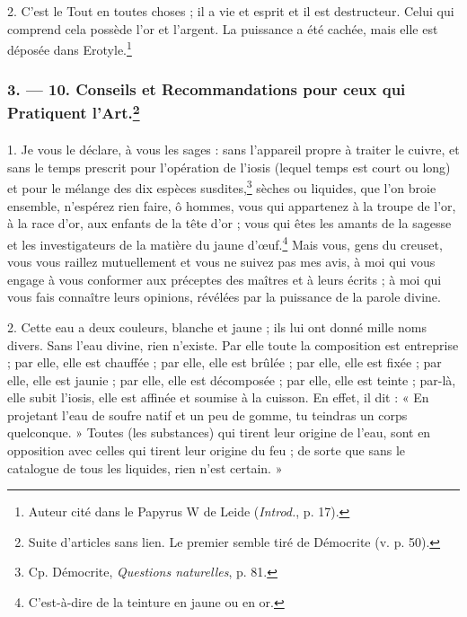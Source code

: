 \documentclass[a4paper, 11pt, oneside, polutonikogreek, french]{article}
\begin{document}
2. C'est le Tout en toutes choses ; il a vie et esprit et il est destructeur. Celui qui comprend cela possède l'or et l'argent. La puissance a été cachée, mais elle est déposée dans Erotyle.\footnote{Auteur cité dans le Papyrus W de Leide (\emph{Introd.}, p. 17).}

\bigskip
\centerline{\EightStarTaper}
\centerline{\EightStarTaper\EightStarTaper}
\bigskip

\subsubsection[3. --- 10. Conseils et Recommandations pour ceux qui Pratiquent l'Art.]{3. --- 10. Conseils et Recommandations pour ceux qui Pratiquent l'Art.\footnote{Suite d'articles sans lien. Le premier semble tiré de Démocrite (v. p. 50).}}
\paragraph{}
1. Je vous le déclare, à vous les sages : sans l'appareil propre à traiter le cuivre, et sans le temps prescrit pour l'opération de l'iosis (lequel temps est court ou long) et pour le mélange des dix espèces susdites,\footnote{Cp. Démocrite, \emph{Questions naturelles}, p. 81.} sèches ou liquides, que l'on broie ensemble, n'espérez rien faire, ô hommes, vous qui appartenez à la troupe de l'or, à la race d'or, aux enfants de la tête d'or ; vous qui êtes les amants de la sagesse et les investigateurs de la matière du jaune d'œuf.\footnote{C'est-à-dire de la teinture en jaune ou en or. } Mais vous, gens du creuset, vous vous raillez mutuellement et vous ne suivez pas mes avis, à moi qui vous engage à vous conformer aux préceptes des maîtres et à leurs écrits ; à moi qui vous fais connaître leurs opinions, révélées par la puissance de la parole divine.

2. Cette eau a deux couleurs, blanche et jaune ; ils lui ont donné mille noms divers. Sans l'eau divine, rien n'existe. Par elle toute la composition est entreprise ; par elle, elle est chauffée ; par elle, elle est brûlée ; par elle, elle est fixée ; par elle, elle est jaunie ; par elle, elle est décomposée ; par elle, elle est teinte ; par-là, elle subit l'iosis, elle est affinée et soumise à la cuisson. En effet, il dit : « En projetant l'eau de soufre natif et un peu de gomme, tu teindras un corps quelconque. » Toutes (les substances) qui tirent leur origine de l'eau, sont en opposition avec celles qui tirent leur origine du feu ; de sorte que sans le catalogue de tous les liquides, rien n'est certain. »
\end{document}
